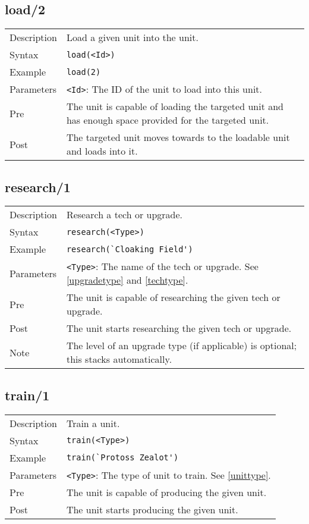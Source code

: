 \subsection{load/2}
\begin{tabularx}{\textwidth}{lX}
 Description & Load a given unit into the unit. \\
 Syntax & \verb|load(<Id>)| \\
 Example & \verb|load(2)| \\
 Parameters & \verb|<Id>|: The ID of the unit to load into this unit. \\
 Pre & The unit is capable of loading the targeted unit and has enough space provided for the targeted unit. \\
 Post & The targeted unit moves towards to the loadable unit and loads into it.
\end{tabularx}

\subsection{research/1}
\begin{tabularx}{\textwidth}{lX}
 Description & Research a tech or upgrade. \\
 Syntax & \verb|research(<Type>)| \\
 Example & \verb|research(`Cloaking Field')| \\
 Parameters & \verb|<Type>|: The name of the tech or upgrade. See \ref{upgradetype} and \ref{techtype}. \\
 Pre & The unit is capable of researching the given tech or upgrade. \\
 Post & The unit starts researching the given tech or upgrade. \\
 Note & The level of an upgrade type (if applicable) is optional; this stacks automatically.
\end{tabularx}

\subsection{train/1}
\begin{tabularx}{\textwidth}{lX}
 Description & Train a unit. \\
 Syntax & \verb|train(<Type>)| \\
 Example & \verb|train(`Protoss Zealot')| \\
 Parameters & \verb|<Type>|: The type of unit to train. See \ref{unittype}. \\
 Pre & The unit is capable of producing the given unit. \\
 Post & The unit starts producing the given unit.
\end{tabularx}

